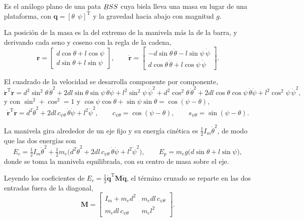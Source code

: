 \documentclass[11pt]{article}
\newcommand{\barbelow}[1]{\underaccent{\bar}{#1}}
\newcommand{\T}{^{\mathrm{T}}}
\begin{document}
Es el análogo plano de una pata $\barbelow{R}SS$ cuya biela lleva una masa en lugar de una plataforma, con $\mathbf{q}=[\theta\ \ \psi]\T$ y la gravedad hacia abajo con magnitud $g$.

La posición de la masa es la del extremo de la manivela más la de la barra, y derivando cada seno y coseno con la regla de la cadena,
\begin{equation}
\mathbf{r}=\begin{bmatrix}d\cos\theta+l\cos\psi\\ d\sin\theta+l\sin\psi\end{bmatrix},
\qquad
\dot{\mathbf{r}}=\begin{bmatrix}-d\sin\theta\,\dot\theta-l\sin\psi\,\dot\psi\\ d\cos\theta\,\dot\theta+l\cos\psi\,\dot\psi\end{bmatrix}.
\label{eq:E1}
\end{equation}

El cuadrado de la velocidad se desarrolla componente por componente,
\begin{equation}
\dot{\mathbf{r}}\T\dot{\mathbf{r}}
=d^2\sin^2\theta\,\dot\theta^2+2dl\sin\theta\sin\psi\,\dot\theta\dot\psi+l^2\sin^2\psi\,\dot\psi^2
+d^2\cos^2\theta\,\dot\theta^2+2dl\cos\theta\cos\psi\,\dot\theta\dot\psi+l^2\cos^2\psi\,\dot\psi^2 ,
\label{eq:E2a}
\end{equation}
y con $\sin^2+\cos^2=1$ y $\cos\psi\cos\theta+\sin\psi\sin\theta=\cos(\psi-\theta)$,
\begin{equation}
\dot{\mathbf{r}}\T\dot{\mathbf{r}}=d^2\dot\theta^2+2dl\,c_{\psi\theta}\,\dot\theta\dot\psi+l^2\dot\psi^2 ,
\qquad
c_{\psi\theta}=\cos(\psi-\theta),
\qquad
s_{\psi\theta}=\sin(\psi-\theta).
\label{eq:E2}
\end{equation}

La manivela gira alrededor de un eje fijo y su energía cinética es $\tfrac12I_m\dot\theta^2$, de modo que las dos energías son
\begin{equation}
E_c=\tfrac12I_m\dot\theta^2+\tfrac12m_e\big(d^2\dot\theta^2+2dl\,c_{\psi\theta}\,\dot\theta\dot\psi+l^2\dot\psi^2\big),
\qquad
E_p=m_eg\big(d\sin\theta+l\sin\psi\big),
\label{eq:E3}
\end{equation}
donde se toma la manivela equilibrada, con su centro de masa sobre el eje.

Leyendo los coeficientes de $E_c=\tfrac12\dot{\mathbf{q}}\T\mathbf{M}\dot{\mathbf{q}}$, el término cruzado se reparte en las dos entradas fuera de la diagonal,
\begin{equation}
\mathbf{M}=\begin{bmatrix}I_m+m_ed^2 & m_edl\,c_{\psi\theta}\\ m_edl\,c_{\psi\theta} & m_el^2\end{bmatrix}.
\label{eq:E4}
\end{equation}
\end{document}
